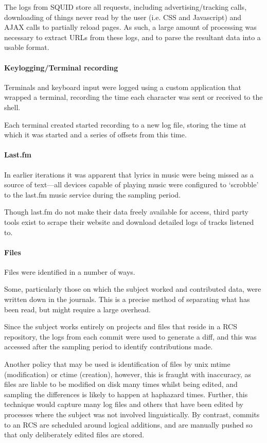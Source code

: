 The logs from SQUID store all requests, including advertising/tracking calls, downloading of things never read by the user (i.e. CSS and Javascript) and AJAX calls to partially reload pages.  As such, a large amount of processing was necessary to extract URLs from these logs, and to parse the resultant data into a usable format.

\paragraph{Keylogging/Terminal recording}
Terminals and keyboard input were logged using a custom application that wrapped a terminal, recording the time each character was sent or received to the shell.

Each terminal created started recording to a new log file, storing the time at which it was started and a series of offsets from this time.

\paragraph{Last.fm}
In earlier iterations it was apparent that lyrics in music were being missed as a source of text---all devices capable of playing music were configured to `scrobble' to the last.fm music service during the sampling period.

Though last.fm do not make their data freely available for access, third party tools exist to scrape their website and download detailed logs of tracks listened to.

\paragraph{Files}
Files were identified in a number of ways.

Some, particularly those on which the subject worked and contributed data, were written down in the journals.  This is a precise method of separating what has been read, but might require a large overhead.

Since the subject works entirely on projects and files that reside in a RCS repository, the logs from each commit were used to generate a diff, and this was accessed after the sampling period to identify contributions made.

Another policy that may be used is identification of files by unix mtime (modification) or ctime (creation), however, this is fraught with inaccuracy, as files are liable to be modified on disk many times whilst being edited, and sampling the differences is likely to happen at haphazard times.  Further, this technique would capture many log files and others that have been edited by processes where the subject was not involved linguistically.  By contrast, commits to an RCS are scheduled around logical additions, and are manually pushed so that only deliberately edited files are stored.

